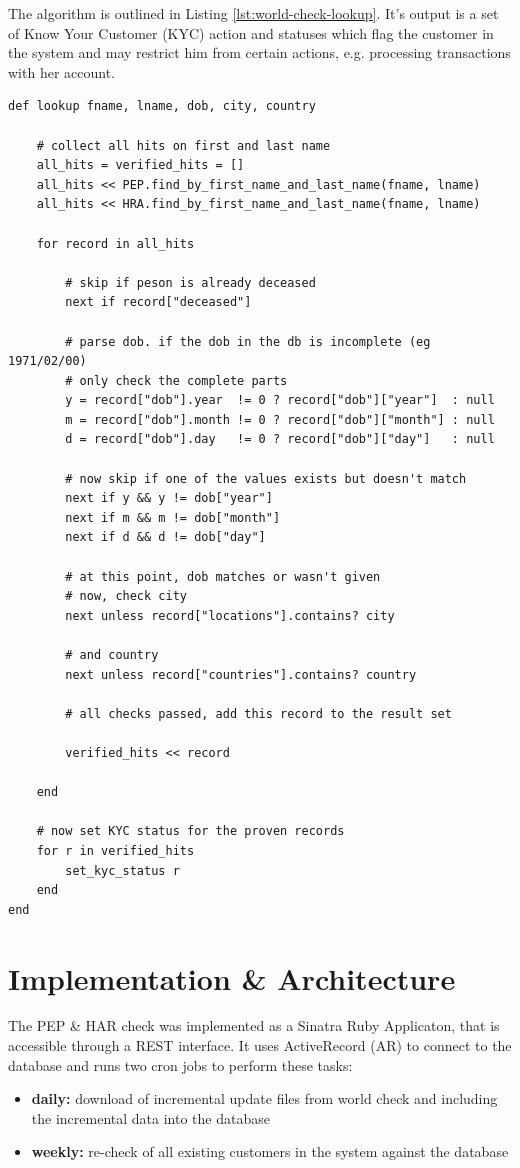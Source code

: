\documentclass[a4paper, oneside]{csthesis}
\begin{document}
The algorithm is outlined in Listing \ref{lst:world-check-lookup}. It's output is a set of Know Your Customer (KYC) action and statuses which flag the customer in the system and may restrict him from certain actions, e.g. processing transactions with her account.

\begin{lstlisting}[caption={The Lookup algorithm},label={lst:world-check-lookup}]
def lookup fname, lname, dob, city, country

    # collect all hits on first and last name
    all_hits = verified_hits = []
    all_hits << PEP.find_by_first_name_and_last_name(fname, lname)
    all_hits << HRA.find_by_first_name_and_last_name(fname, lname)

    for record in all_hits

        # skip if peson is already deceased
        next if record["deceased"]

        # parse dob. if the dob in the db is incomplete (eg 1971/02/00)
        # only check the complete parts
        y = record["dob"].year  != 0 ? record["dob"]["year"]  : null
        m = record["dob"].month != 0 ? record["dob"]["month"] : null
        d = record["dob"].day   != 0 ? record["dob"]["day"]   : null

        # now skip if one of the values exists but doesn't match
        next if y && y != dob["year"]
        next if m && m != dob["month"]
        next if d && d != dob["day"]

        # at this point, dob matches or wasn't given
        # now, check city
        next unless record["locations"].contains? city

        # and country
        next unless record["countries"].contains? country

        # all checks passed, add this record to the result set

        verified_hits << record

    end

    # now set KYC status for the proven records
    for r in verified_hits
        set_kyc_status r
    end
end
\end{lstlisting}


\section{Implementation \& Architecture}

The PEP \& HAR check was implemented as a Sinatra Ruby Applicaton, that is accessible through a REST interface. It uses ActiveRecord (AR) to connect to the database and runs two cron jobs to perform these tasks:
\begin{itemize}
\item \textbf{daily:} download of incremental update files from world check and including the incremental data into the database
\item \textbf{weekly:} re-check of all existing customers in the system against the database
\end{itemize}
\end{document}
